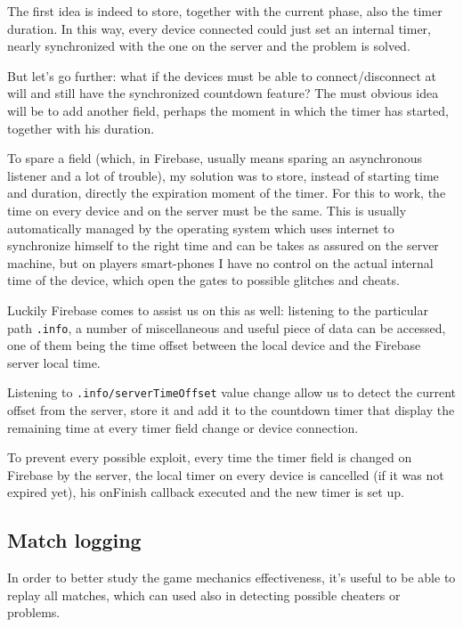 			The first idea is indeed to store, together with the current phase, also the timer duration.
			In this way, every device connected could just set an internal timer, nearly synchronized with the one on the server and the problem is solved.
			
			But let's go further: what if the devices must be able to connect/disconnect at will and still have the synchronized countdown feature?
			The must obvious idea will be to add another field, perhaps the moment in which the timer has started, together with his duration.
			
			To spare a field (which, in Firebase, usually means sparing an asynchronous listener and a lot of trouble), my solution was to store, instead of starting time and duration, directly the expiration moment of the timer.
			For this to work, the time on every device and on the server must be the same. This is usually automatically managed by the operating system which uses internet to synchronize himself to the right time and can be takes as assured on the server machine, but on players smart-phones I have no control on the actual internal time of the device, which open the gates to possible glitches and cheats.
			
			Luckily Firebase comes to assist us on this as well: listening to the particular path \lstinline|.info|, a number of miscellaneous and useful piece of data can be accessed, one of them being the time offset between the local device and the Firebase server local time.
			
			Listening to \lstinline|.info/serverTimeOffset| value change allow us to detect the current offset from the server, store it and add it to the countdown timer that display the remaining time at every timer field change or device connection.
			
			To prevent every possible exploit, every time the timer field is changed on Firebase by the server, the local timer on every device is cancelled (if it was not expired yet), his onFinish callback executed and the new timer is set up.
		
		\subsection{Match logging}\label{focus:log}
		
			In order to better study the game mechanics effectiveness, it's useful to be able to replay all matches, which can used also in detecting possible cheaters or problems.
			
